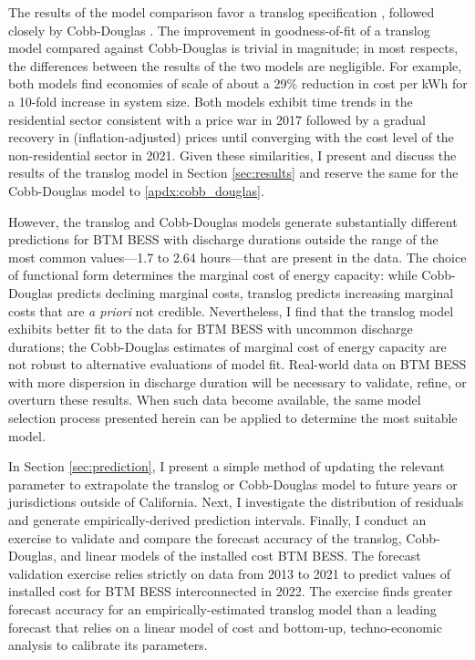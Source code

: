 \documentclass[preprint,12pt,authoryear]{elsarticle}
\begin{document}
The results of the model comparison favor a translog specification \citep{kmenta1967}, followed closely by Cobb-Douglas \citep{cobbdouglas1928}. The improvement in goodness-of-fit of a translog model compared against Cobb-Douglas is trivial in magnitude; in most respects, the differences between the results of the two models are negligible. For example, both models find economies of scale of about a 29\% reduction in cost per kWh for a 10-fold increase in system size. Both models exhibit time trends in the residential sector consistent with a price war in 2017 followed by a gradual recovery in (inflation-adjusted) prices until converging with the cost level of the non-residential sector in 2021. Given these similarities, I present and discuss the results of the translog model in Section \ref{sec:results} and reserve the same for the Cobb-Douglas model to \ref{apdx:cobb_douglas}.

However, the translog and Cobb-Douglas models generate substantially different predictions for BTM BESS with discharge durations outside the range of the most common values---1.7 to 2.64 hours---that are present in the data. The choice of functional form determines the marginal cost of energy capacity: while Cobb-Douglas predicts declining marginal costs, translog predicts increasing marginal costs that are \textit{a priori} not credible. Nevertheless, I find that the translog model exhibits better fit to the data for BTM BESS with uncommon discharge durations; the Cobb-Douglas estimates of marginal cost of energy capacity are not robust to alternative evaluations of model fit. Real-world data on BTM BESS with more dispersion in discharge duration will be necessary to validate, refine, or overturn these results. When such data become available, the same model selection process presented herein can be applied to determine the most suitable model.

 In Section \ref{sec:prediction}, I present a simple method of updating the relevant parameter to extrapolate the translog or Cobb-Douglas model to future years or jurisdictions outside of California. Next, I investigate the distribution of residuals and generate empirically-derived prediction intervals. Finally, I conduct an exercise to validate and compare the forecast accuracy of the translog, Cobb-Douglas, and linear models of the installed cost BTM BESS. The forecast validation exercise relies strictly on data from 2013 to 2021 to predict values of installed cost for BTM BESS interconnected in 2022. The exercise finds greater forecast accuracy for an empirically-estimated translog model than a leading forecast that relies on a linear model of cost and bottom-up, techno-economic analysis to calibrate its parameters.
 
\end{document}
